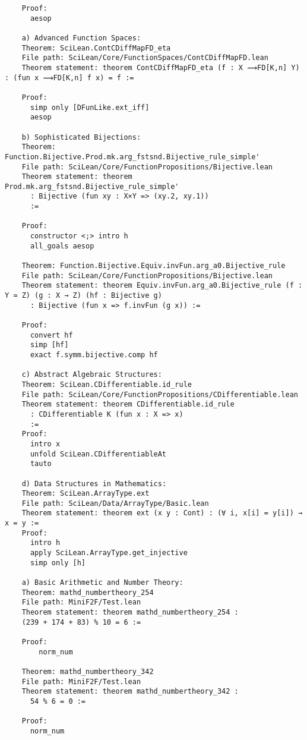 \documentclass{article} %
\begin{document}
\begin{verbatim}
    Proof:
      aesop

    a) Advanced Function Spaces:
    Theorem: SciLean.ContCDiffMapFD_eta
    File path: SciLean/Core/FunctionSpaces/ContCDiffMapFD.lean
    Theorem statement: theorem ContCDiffMapFD_eta (f : X ⟿FD[K,n] Y) : (fun x ⟿FD[K,n] f x) = f :=
    
    Proof:
      simp only [DFunLike.ext_iff]
      aesop

    b) Sophisticated Bijections:
    Theorem: Function.Bijective.Prod.mk.arg_fstsnd.Bijective_rule_simple'
    File path: SciLean/Core/FunctionPropositions/Bijective.lean
    Theorem statement: theorem Prod.mk.arg_fstsnd.Bijective_rule_simple'
      : Bijective (fun xy : X×Y => (xy.2, xy.1))
      :=
    
    Proof:
      constructor <;> intro h
      all_goals aesop
    
    Theorem: Function.Bijective.Equiv.invFun.arg_a0.Bijective_rule
    File path: SciLean/Core/FunctionPropositions/Bijective.lean
    Theorem statement: theorem Equiv.invFun.arg_a0.Bijective_rule (f : Y ≃ Z) (g : X → Z) (hf : Bijective g)
      : Bijective (fun x => f.invFun (g x)) :=
    
    Proof:
      convert hf
      simp [hf]
      exact f.symm.bijective.comp hf

    c) Abstract Algebraic Structures:
    Theorem: SciLean.CDifferentiable.id_rule
    File path: SciLean/Core/FunctionPropositions/CDifferentiable.lean
    Theorem statement: theorem CDifferentiable.id_rule
      : CDifferentiable K (fun x : X => x)
      :=
    Proof:
      intro x
      unfold SciLean.CDifferentiableAt
      tauto

    d) Data Structures in Mathematics:
    Theorem: SciLean.ArrayType.ext
    File path: SciLean/Data/ArrayType/Basic.lean
    Theorem statement: theorem ext (x y : Cont) : (∀ i, x[i] = y[i]) → x = y :=
    Proof:
      intro h
      apply SciLean.ArrayType.get_injective
      simp only [h]

    a) Basic Arithmetic and Number Theory:
    Theorem: mathd_numbertheory_254
    File path: MiniF2F/Test.lean
    Theorem statement: theorem mathd_numbertheory_254 :
    (239 + 174 + 83) % 10 = 6 :=
    
    Proof:
        norm_num

    Theorem: mathd_numbertheory_342
    File path: MiniF2F/Test.lean
    Theorem statement: theorem mathd_numbertheory_342 :
      54 % 6 = 0 :=
    
    Proof:
      norm_num


\end{verbatim}
\end{document}
